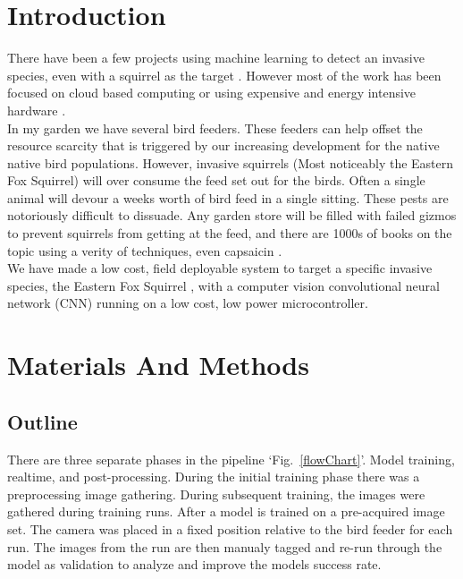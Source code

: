 \documentclass[conference]{IEEEtran}
\begin{document}

\section{Introduction}
There have been a few projects using machine learning to detect an invasive species, even with a squirrel as the target  \cite{king} \cite{mary}. However most of the work has been focused on cloud based computing  \cite{mary} or using expensive and energy intensive hardware \cite{king}.\\

In my garden we have several bird feeders. These feeders can help offset the resource scarcity that is triggered by our increasing development for the native native bird populations. However, invasive squirrels (Most noticeably the Eastern Fox Squirrel) will over consume the feed set out for the birds. Often a single animal will devour a weeks worth of bird feed in a single sitting. These pests are notoriously difficult to dissuade. Any garden store will be filled with failed gizmos to prevent squirrels from getting at the feed, and there are 1000s of books on the topic using a verity of techniques, even capsaicin  \cite{chap}.\\

We have made a low cost, field deployable system to target a specific invasive species, the Eastern Fox Squirrel \cite{krause}, with a computer vision convolutional neural network (CNN) running on a low cost, low power microcontroller.

\section{Materials And Methods}

\subsection{Outline}

There are three separate phases in the pipeline `Fig.~\ref{flowChart}'. Model training, realtime, and post-processing. During the  initial training phase there was a preprocessing image gathering. During subsequent training, the images were gathered during training runs.
After a model is trained on a pre-acquired image set. The camera was placed in a fixed position relative to the bird feeder for each run. The images from the run are then manualy tagged and re-run through the model as validation to analyze and improve the models success rate.  \\
\end{document}
